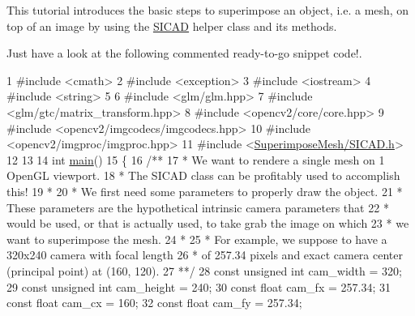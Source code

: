 This tutorial introduces the basic steps to superimpose an object, i.\+e. a mesh, on top of an image by using the \mbox{\hyperlink{classSICAD}{S\+I\+C\+AD}} helper class and its methods.~\newline


Just have a look at the following commented ready-\/to-\/go snippet code!.~\newline



\begin{DoxyCodeInclude}
1 \textcolor{preprocessor}{#include <cmath>}
2 \textcolor{preprocessor}{#include <exception>}
3 \textcolor{preprocessor}{#include <iostream>}
4 \textcolor{preprocessor}{#include <string>}
5 
6 \textcolor{preprocessor}{#include <glm/glm.hpp>}
7 \textcolor{preprocessor}{#include <glm/gtc/matrix\_transform.hpp>}
8 \textcolor{preprocessor}{#include <opencv2/core/core.hpp>}
9 \textcolor{preprocessor}{#include <opencv2/imgcodecs/imgcodecs.hpp>}
10 \textcolor{preprocessor}{#include <opencv2/imgproc/imgproc.hpp>}
11 \textcolor{preprocessor}{#include <\mbox{\hyperlink{SICAD_8h}{SuperimposeMesh/SICAD.h}}>}
12 
13 
14 \textcolor{keywordtype}{int} \mbox{\hyperlink{tutorial__superimpose_8cpp_ae66f6b31b5ad750f1fe042a706a4e3d4}{main}}()
15 \{\textcolor{comment}{}
16 \textcolor{comment}{    /**}
17 \textcolor{comment}{     * We want to rendere a single mesh on 1 OpenGL viewport.}
18 \textcolor{comment}{     * The SICAD class can be profitably used to accomplish this!}
19 \textcolor{comment}{     *}
20 \textcolor{comment}{     * We first need some parameters to properly draw the object.}
21 \textcolor{comment}{     * These parameters are the hypothetical intrinsic camera parameters that}
22 \textcolor{comment}{     * would be used, or that is actually used, to take grab the image on which}
23 \textcolor{comment}{     * we want to superimpose the mesh.}
24 \textcolor{comment}{     *}
25 \textcolor{comment}{     * For example, we suppose to have a 320x240 camera with focal length}
26 \textcolor{comment}{     * of 257.34 pixels and exact camera center (principal point) at (160, 120).}
27 \textcolor{comment}{     **/}
28     \textcolor{keyword}{const} \textcolor{keywordtype}{unsigned} \textcolor{keywordtype}{int} cam\_width  = 320;
29     \textcolor{keyword}{const} \textcolor{keywordtype}{unsigned} \textcolor{keywordtype}{int} cam\_height = 240;
30     \textcolor{keyword}{const} \textcolor{keywordtype}{float}        cam\_fx     = 257.34;
31     \textcolor{keyword}{const} \textcolor{keywordtype}{float}        cam\_cx     = 160;
32     \textcolor{keyword}{const} \textcolor{keywordtype}{float}        cam\_fy     = 257.34;

\end{DoxyCodeInclude}
